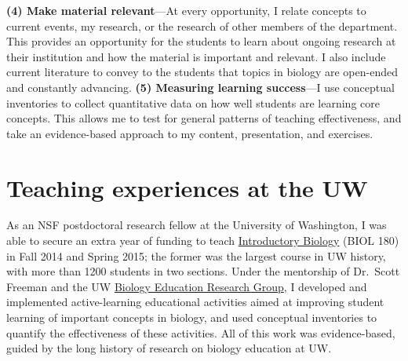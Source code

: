 \textbf{(4) Make material relevant}---At every opportunity, I relate concepts
to current events, my research, or the research of other members of the
department.
This provides an opportunity for the students to learn about ongoing
research at their institution and how the material is important and relevant.
I also include current literature to convey to the students that topics in
biology are open-ended and constantly advancing.
\textbf{(5) Measuring learning success}---I use conceptual inventories to
collect quantitative data on how well students are learning core concepts.
This allows me to test for general patterns of teaching effectiveness, and take
an evidence-based approach to my content, presentation, and exercises.

\section*{Teaching experiences at the UW}
As an NSF postdoctoral research fellow at the University of Washington,
I was able to secure an extra year of funding to teach
\href{http://courses.biology.washington.edu/biol180/}{Introductory Biology}
(BIOL 180) in Fall 2014 and Spring 2015;
the former was the largest course in UW history, with more than 1200 students
in two sections.
Under the mentorship of Dr.\ Scott Freeman and the UW
\href{https://sites.google.com/site/uwbioedresgroup/home}{Biology Education
    Research Group}, I developed and implemented active-learning
educational activities aimed at improving student learning of important
concepts in biology,
and used conceptual inventories to quantify the effectiveness of these
activities.
All of this work was evidence-based, guided by the long history of research on
biology education at UW.

